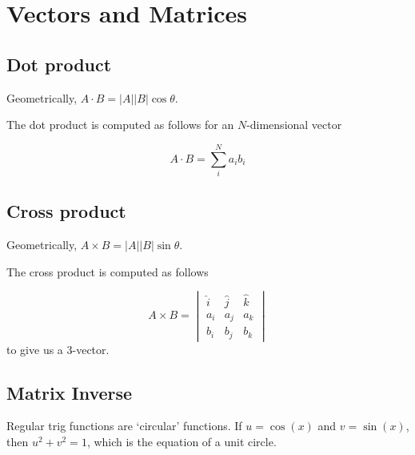 
\section{Vectors and Matrices}

\subsection*{Dot product}

Geometrically, $A \cdot B = |A| |B| \cos \theta$.

The dot product is computed as follows for an $N$-dimensional vector

\begin{equation*}
  A \cdot B = \sum_{i}^{N} a_i b_i
\end{equation*}

\subsection*{Cross product}

Geometrically, $A \times B = |A| |B| \sin \theta$.

The cross product is computed as follows

\begin{equation*}
  A \times B = \begin{vmatrix} \hat{i} & \hat{j} & \hat{k} \\ a_i & a_j & a_k \\ b_i  & b_j & b_k\end{vmatrix}
\end{equation*}
to give us a 3-vector.

\subsection*{Matrix Inverse}
Regular trig functions are `circular' functions. If $u = \cos(x)$ and $v = \sin(x)$, then $u^2 + v^2 = 1$, which is the equation of a unit circle.

